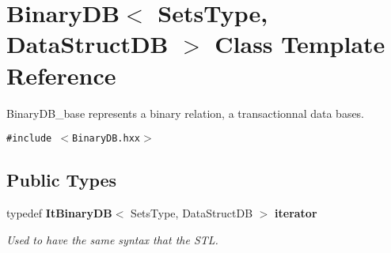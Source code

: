 \section{Binary\-DB$<$ Sets\-Type, Data\-Struct\-DB $>$ Class Template Reference}
\label{class_binary_d_b}
Binary\-DB\_\-base represents a binary relation, a transactionnal data bases.  


{\tt \#include $<$Binary\-DB.hxx$>$}

\subsection*{Public Types}
\begin{CompactItemize}
\item 
typedef {\bf It\-Binary\-DB}$<$ Sets\-Type, Data\-Struct\-DB $>$ {\bf iterator}\label{class_binary_d_b_48c97a6dac76e31fdc0ed035c2bfb29a}

\begin{CompactList}\small\item\em Used to have the same syntax that the STL. \item\end{CompactList}\end{CompactItemize}
